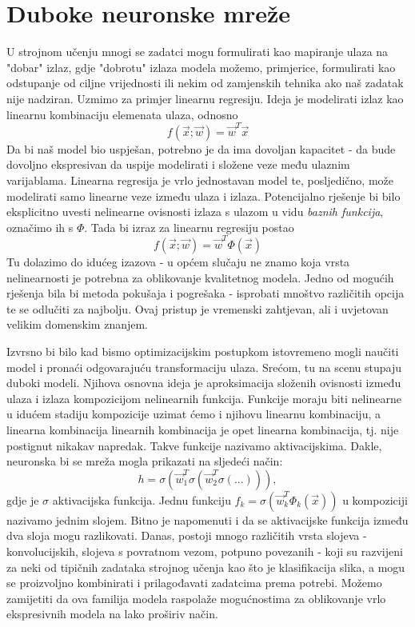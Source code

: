 \section{Duboke neuronske mreže}
U strojnom učenju mnogi se zadatci mogu formulirati kao mapiranje ulaza na "dobar" izlaz, gdje "dobrotu" izlaza modela možemo, primjerice, formulirati kao odstupanje od ciljne vrijednosti ili nekim od zamjenskih tehnika ako naš zadatak nije nadziran. Uzmimo za primjer linearnu regresiju. Ideja je modelirati izlaz kao linearnu kombinaciju elemenata ulaza, odnosno
\begin{equation*}
	f(\vec{x}; \vec{w}) = \vec{w}^T\vec{x}
\end{equation*}
Da bi naš model bio uspješan, potrebno je da ima dovoljan kapacitet - da bude dovoljno ekspresivan da uspije modelirati i složene veze među ulaznim varijablama. Linearna regresija je vrlo jednostavan model te, posljedično, može modelirati samo linearne veze između ulaza i izlaza. Potencijalno rješenje bi bilo eksplicitno uvesti nelinearne ovisnosti izlaza s ulazom u vidu \textit{baznih funkcija}, označimo ih s $\Phi$. Tada bi izraz za linearnu regresiju postao
\begin{equation*}
	f(\vec{x}; \vec{w}) = \vec{w}^T\Phi(\vec{x})
\end{equation*}
Tu dolazimo do idućeg izazova - u općem slučaju ne znamo koja vrsta nelinearnosti je potrebna za oblikovanje kvalitetnog modela. Jedno od mogućih rješenja bila bi metoda pokušaja i pogrešaka - isprobati mnoštvo različitih opcija te se odlučiti za najbolju. Ovaj pristup je vremenski zahtjevan, ali i uvjetovan velikim domenskim znanjem. 

Izvrsno bi bilo kad bismo optimizacijskim postupkom istovremeno mogli naučiti model i pronaći odgovarajuću transformaciju ulaza. Srećom, tu na scenu stupaju duboki modeli. Njihova osnovna ideja je aproksimacija složenih ovisnosti između ulaza i izlaza kompozicijom nelinearnih funkcija. Funkcije moraju biti nelinearne u idućem stadiju kompozicije uzimat ćemo i njihovu linearnu kombinaciju, a linearna kombinacija linearnih kombinacija je opet linearna kombinacija, tj. nije postignut nikakav napredak. Takve funkcije nazivamo aktivacijskima. Dakle, neuronska bi se mreža mogla prikazati na sljedeći način:
\begin{equation*}
	h = \sigma(\vec{w}_1^T\sigma(\vec{w}_2^T\sigma(...))),
\end{equation*}
gdje je $\sigma$ aktivacijska funkcija. Jednu funkciju $f_k = \sigma(\vec{w}_k^T\Phi_k(\vec{x}))$ u kompoziciji nazivamo jednim slojem. Bitno je napomenuti i da se aktivacijske funkcija između dva sloja mogu razlikovati. Danas, postoji mnogo različitih vrsta slojeva - konvolucijskih, slojeva s povratnom vezom, potpuno povezanih - koji su razvijeni za neki od tipičnih zadataka strojnog učenja kao što je klasifikacija slika, a mogu se proizvoljno kombinirati i prilagođavati zadatcima prema potrebi. Možemo zamijetiti da ova familija modela raspolaže mogućnostima za oblikovanje vrlo ekspresivnih modela na lako proširiv način.

